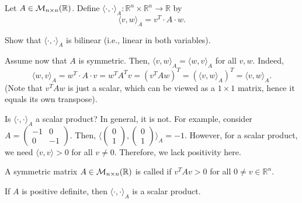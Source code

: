 \begin{example}
    Let $A \in \mathcal{M}_{n \times n}(\mathbb{R})$. Define $\langle \cdot, \cdot \rangle_A : \mathbb{R}^n \times \mathbb{R}^n \to \mathbb{R}$ by
    \begin{equation*}
        \langle v, w \rangle_A = v^T \cdot A \cdot w.
    \end{equation*}
    
    \begin{exercise}
        Show that $\langle \cdot, \cdot \rangle_A$ is bilinear (i.e., linear in both variables).
    \end{exercise}
    
    Assume now that $A$ is symmetric. Then, $\langle v, w \rangle_A = \langle w, v \rangle_A$ for all $v, w$. Indeed,
    \begin{equation*}
        \langle w, v \rangle_A = w^T \cdot A \cdot v = w^T A^T v = (v^T A w)^T = (\langle v, w \rangle_A)^T = \langle v, w \rangle_A.
    \end{equation*}
    (Note that $v^T A w$ is just a scalar, which can be viewed as a $1 \times 1$ matrix, hence it equals its own transpose). 
    
    Is $\langle \cdot, \cdot \rangle_A$ a scalar product? In general, it is not. For example, consider $A = \left(\begin{smallmatrix} -1 & 0 \\ 0 & -1 \end{smallmatrix}\right)$. Then, $\langle \left(\begin{smallmatrix} 0 \\ 1 \end{smallmatrix}\right), \left(\begin{smallmatrix} 0 \\ 1 \end{smallmatrix}\right) \rangle_A = -1$. However, for a scalar product, we need $\langle v, v \rangle > 0$ for all $v \neq 0$. Therefore, we lack positivity here.
\end{example}

\begin{definition}
    A symmetric matrix $A \in \mathcal{M}_{n \times n}(\mathbb{R})$ is called  if $v^T A v > 0$ for all $0 \neq v \in \mathbb{R}^n$.
\end{definition}

\begin{claim*}
    If $A$ is positive definite, then $\langle \cdot, \cdot \rangle_A$ is a scalar product.
\end{claim*}


